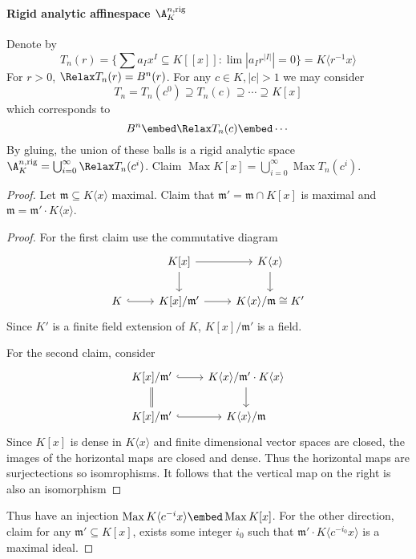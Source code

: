 \documentclass[a4paper]{article}
\let\Sp\Relax
\DeclareMathOperator{\Sp}{Sp} %
\DeclareMathOperator{\Max}{Max}
\begin{document}
\paragraph{Rigid analytic affinespace \(\A_K^{n, \mathrm{rig}}\)}

Denote by
\[
  T_n(r) = \{\sum a_I x^I \subseteq K[[x]]: \lim |a_I r^{|I|}| = 0\} = K \langle r^{-1} x \rangle
\]
For \(r > 0\), \(\Sp T_n(r) = B^n(r)\). For any \(c \in K, |c| > 1\) we may consider
\[
  T_n = T_n(c^0) \supseteq T_n(c) \supseteq \cdots \supseteq K[x]
\]
which corresponds to
\[
  B^n \embed \Sp T_n(c) \embed \cdots
\]
By gluing, the union of these balls is a rigid analytic space \(\A_K^{n, \mathrm{rig}} = \bigcup_{i = 0}^\infty \Sp T_n(c^i)\). Claim \(\Max K[x] = \bigcup_{i = 0}^\infty \Max T_n(c^i)\).

\begin{proof}
  Let \(\mathfrak m \subseteq K\langle x\rangle\) maximal. Claim that \(\mathfrak m' = \mathfrak m \cap K[x]\) is maximal and \(\mathfrak m = \mathfrak m' \cdot K\langle x\rangle\).

  \begin{proof}
    For the first claim use the commutative diagram
    \[
      \begin{tikzcd}
        & K[x] \ar[r] \ar[d] & K \langle x\rangle \ar[d] \\
        K \ar[r, hook] & K[x]/\mathfrak m' \ar[r] & K\langle x\rangle /\mathfrak m \cong K'
      \end{tikzcd}
    \]
    Since \(K'\) is a finite field extension of \(K\), \(K[x]/\mathfrak m'\) is a field.

    For the second claim, consider
    \[
      \begin{tikzcd}
        K[x]/\mathfrak m' \ar[r, hook] \ar[d, equal] & K \langle x\rangle/\mathfrak m' \cdot K \langle x\rangle \ar[d] \\
        K[x]/\mathfrak m' \ar[r, hook] & K \langle x\rangle /\mathfrak m
      \end{tikzcd}
    \]
    Since \(K[x]\) is dense in \(K\langle x\rangle\) and finite dimensional vector spaces are closed, the images of the horizontal maps are closed and dense. Thus the horizontal maps are surjectections so isomrophisms. It follows that the vertical map on the right is also an isomorphism
  \end{proof}

  Thus have an injection \(\Max K \langle c^{-i} x\rangle \embed \Max K[x]\). For the other direction, claim for any \(\mathfrak m' \subseteq K[x]\), exists some integer \(i_0\) such that \(\mathfrak m' \cdot K \langle c^{-i_0} x\rangle\) is a maximal ideal.


\end{proof}
\end{document}
